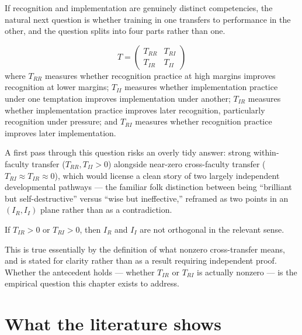 If recognition and implementation are genuinely distinct competencies, the natural next question is whether training in one transfers to performance in the other, and the question splits into four parts rather than one.

\begin{definition}
\[
T = \begin{pmatrix} T_{RR} & T_{RI} \\ T_{IR} & T_{II} \end{pmatrix}
\]
where $T_{RR}$ measures whether recognition practice at high margins improves recognition at lower margins; $T_{II}$ measures whether implementation practice under one temptation improves implementation under another; $T_{IR}$ measures whether implementation practice improves later recognition, particularly recognition under pressure; and $T_{RI}$ measures whether recognition practice improves later implementation.
\end{definition}

\begin{naivemodel}
A first pass through this question risks an overly tidy answer: strong within-faculty transfer ($T_{RR}, T_{II} > 0$) alongside near-zero cross-faculty transfer ($T_{RI} \approx T_{IR} \approx 0$), which would license a clean story of two largely independent developmental pathways --- the familiar folk distinction between being ``brilliant but self-destructive'' versus ``wise but ineffective,'' reframed as two points in an $(I_R, I_I)$ plane rather than as a contradiction.
\end{naivemodel}

\begin{proposition}
If $T_{IR} > 0$ or $T_{RI} > 0$, then $I_R$ and $I_I$ are not orthogonal in the relevant sense.
\end{proposition}

This is true essentially by the definition of what nonzero cross-transfer means, and is stated for clarity rather than as a result requiring independent proof. Whether the antecedent holds --- whether $T_{IR}$ or $T_{RI}$ is actually nonzero --- is the empirical question this chapter exists to address.

\section{What the literature shows}


